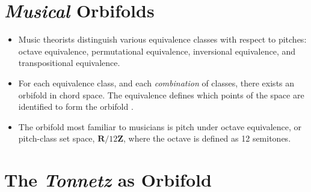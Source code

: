 \documentclass[14pt,letterpaper,onecolumn]{scrartcl}
\begin{document}
\section{\emph{Musical} Orbifolds}

\begin{itemize}

\item Music theorists distinguish various equivalence classes with respect to pitches: octave equivalence, permutational equivalence, inversional equivalence, and transpositional equivalence.

\item For each equivalence class, and each \emph{combination} of classes, there exists an orbifold in chord space. The equivalence defines which points of the space are identified to form the orbifold \cite{generalizedchordspaces}. 

\item The orbifold most familiar to musicians is pitch under octave equivalence, or pitch-class set space, $\textbf{R}/12\textbf{Z}$, where the octave is defined as 12 semitones.
	
\end{itemize}

\section{The \emph{Tonnetz} as Orbifold}
\end{document}
